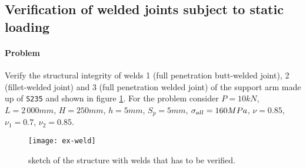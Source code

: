 \newpage
\subsection{Verification of welded joints subject to static loading}
	
	\paragraph{Problem} Verify the structural integrity of welds 1 (full penetration butt-welded joint), 2 (fillet-welded joint) and 3 (full penetration welded joint) of the support arm made up of \texttt{S235} and shown in figure \ref{ex:welddraw}. For the problem consider $P = 10kN$, $L=2\,000mm$, $H=250mm$, $h = 5mm$, $S_p = 5mm$, $\sigma_{all} = 160 MPa$, $\nu= 0.85$, $\nu_1 = 0.7$, $\nu_2= 0.85$.
	
	
	\begin{figure}[bht]
		\centering \texttt{[image: ex-weld]}
		\caption{sketch of the structure with welds that has to be verified.} \label{ex:welddraw}
	\end{figure}
	
